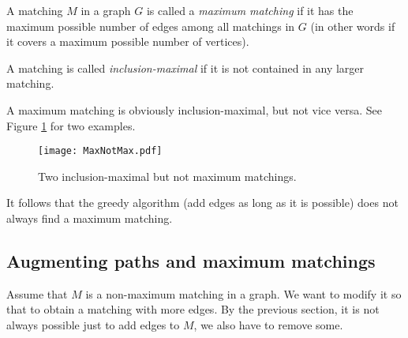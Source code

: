 \begin{page}
\setcounter{section}{4}
\setcounter{subsection}{1}
\setcounter{dfn}{2}
\label{portion:373}

\begin{dfn}
A matching $M$ in a graph $G$ is called a \emph{maximum matching} if it has the maximum possible number of edges among all matchings in $G$
(in other words if it covers a maximum possible number of vertices).

A matching is called \emph{inclusion-maximal} if it is not contained in any larger matching.
\end{dfn}

\end{page}

\begin{page}
\setcounter{section}{4}
\setcounter{subsection}{2}
\setcounter{dfn}{2}
\label{portion:374}


A maximum matching is obviously inclusion-maximal, but not vice versa.
See Figure \ref{fig:MaxNotMax} for two examples.

\begin{figure}[ht]
\begin{center}
\texttt{[image: MaxNotMax.pdf]}
\end{center}
\caption{Two inclusion-maximal but not maximum matchings.}
\label{fig:MaxNotMax}
\end{figure}

It follows that the greedy algorithm (add edges as long as it is possible) does not always find a maximum matching.




\end{page}

\begin{page}
\setcounter{section}{4}
\setcounter{subsection}{2}
\setcounter{dfn}{2}
\label{portion:376}

\subsection{Augmenting paths and maximum matchings}
Assume that $M$ is a non-maximum matching in a graph.
We want to modify it so that to obtain a matching with more edges.
By the previous section, it is not always possible just to add edges to $M$, we also have to remove some.


\end{page}

